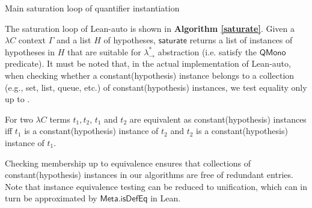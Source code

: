\begin{algorithm}\label{saturate}
  \DontPrintSemicolon
  \SetNoFillComment
  \caption{Main saturation loop of quantifier instantiation}
\end{algorithm}

The saturation loop of Lean-auto is shown in \textbf{Algorithm \ref{saturate}}.
Given a $\lambda C$ context $\Gamma$ and a list $H$ of hypotheses, $\mathsf{saturate}$ returns
a list of instances of hypotheses in $H$ that are suitable for $\lambda_\to^*$ abstraction
(i.e. satisfy the $\mathsf{QMono}$ predicate).
It must be noted that, in the actual implementation of Lean-auto, when
checking whether a constant(hypothesis) instance belongs to a collection (e.g., set, list, queue, etc.)
of constant(hypothesis) instances, we test equality only up to .

\begin{definition}
For two $\lambda C$ terms $t_1, t_2$, $t_1$ and $t_2$ are equivalent as constant(hypothesis) instances
iff $t_1$ is a constant(hypothesis) instance of $t_2$ and $t_2$ is a constant(hypothesis)
instance of $t_1$.
\end{definition}

Checking membership up to equivalence ensures that collections of constant(hypothesis)
instances in our algorithms are free of redundant entries. Note that instance equivalence testing
can be reduced to unification, which can in turn be approximated by $\mathsf{Meta.isDefEq}$ in Lean.
 